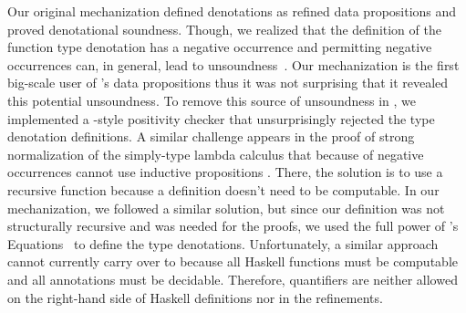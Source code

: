 Our original \lh mechanization defined  
denotations as refined data propositions
and proved denotational soundness. 
Though, we realized that the definition 
of the function type denotation
has a negative occurrence and permitting negative occurrences
can, in general, lead to unsoundness~\cite{CP90}. 
%
Our mechanization is the first big-scale user of 
\lh's data propositions thus it was not surprising that it revealed 
this potential unsoundness.
%
To remove this source of unsoundness in \lh, 
we implemented a \coq-style positivity checker
that unsurprisingly rejected the type denotation definitions. 
%
A similar challenge appears in the proof of strong normalization 
of the simply-type lambda calculus that because of negative occurrences
cannot use inductive propositions \cite{Pierce:SF2}.
There, the solution is to use a recursive function 
because a definition doesn't need to be computable.
%
In our \coq mechanization, we followed a similar solution, 
but since our definition was not structurally recursive and 
was needed for the proofs, we used 
the full power of \coq's Equations~\cite{10.1145/3341690} to define 
the type denotations. 
%
Unfortunately, a similar approach cannot currently carry over to \lh
because all Haskell functions must be computable and all
\lh annotations must be decidable. Therefore, quantifiers
are neither allowed on the right-hand side of Haskell
definitions nor in the refinements. %


